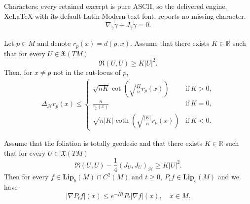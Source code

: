 \documentclass[10pt,a4paper]{amsart}
\newcommand{\Ho}{\mathcal H}
\begin{document}
Characters: every retained excerpt is pure ASCII, so the delivered engine, XeLaTeX with its default Latin Modern text font, reports no missing character.
\begin{align}\label{geodesic1}
\nabla_{\dot\gamma} \dot\gamma+ J_{\dot\gamma} \dot\gamma =0.
\end{align}

\begin{theorem}\label{comparison laplacian}
Let $p \in M$ and denote $r_p(x)=d(p,x)$. Assume that there exists $K \in \mathbb{R}$ such that for every $U \in \mathfrak{X}(TM)$
\[
\mathfrak{R}(U,U) \ge K |U|^2.
\] 
Then, for $x\neq p$ not in the  cut-locus of $p$,
\begin{align*}
\Delta_\Ho r_p (x) \le 
\begin{cases}
 \sqrt { nK} \cot\left(\sqrt { \frac{K}{n}} r_p(x) \right) &\text{if}\ K>0,
\\
\displaystyle\frac{n}{r_p(x)} &\text{if}\ K = 0,
\\
 \sqrt{n |K|} \coth\left(\sqrt{\frac{|K|}{n}} r_p(x)\right) &\text{if}\ K<0.
\end{cases}
\end{align*}

\end{theorem}

\begin{theorem}\label{GB total}
 Assume that the foliation is totally geodesic and that there exists $K \in \mathbb{R}$ such that for every $U \in \mathfrak{X}(TM)$
\[
\mathfrak{R}(U,U) -\frac{1}{4} (J_U,J_U)_\Ho \ge K |U|^2.
\] 
Then for every $f \in \mathbf{Lip}_b (M) \cap C^2(M)$ and $t \ge 0$, $P_tf \in \mathbf{Lip}_b (M)$ and we have
\[
|\nabla P_t f|(x)\le e^{-Kt} P_t |\nabla f| (x), \quad x \in M.
\] 
\end{theorem}
\end{document}

